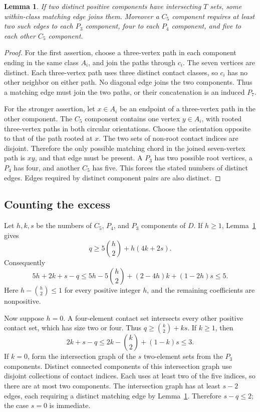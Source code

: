 \documentclass[11pt,a4paper]{article}
\newtheorem{lemma}[theorem]{Lemma}
\theoremstyle{definition}\newtheorem{definition}[theorem]{Definition}
\theoremstyle{remark}\newtheorem{remark}[theorem]{Remark}
\begin{document}
\begin{lemma}\label{local15:lem:force}
If two distinct positive components have intersecting $T$ sets, some
within-class matching edge joins them. Moreover a $C_5$ component
requires at least two such edges to each $P_3$ component, four to each
$P_4$ component, and five to each other $C_5$ component.
\end{lemma}
\begin{proof}
For the first assertion, choose a three-vertex path in each component
ending in the same class $A_i$, and join the paths through $c_i$.
The seven vertices are distinct. Each three-vertex path uses three
distinct contact classes, so $c_i$ has no other neighbor on either path.
No diagonal edge joins the two components. Thus a matching edge must
join the two paths, or their concatenation is an induced $P_7$.

For the stronger assertion, let $x\in A_i$ be an endpoint of a
three-vertex path in the other component. The $C_5$ component contains
one vertex $y\in A_i$, with rooted three-vertex paths in both circular
orientations. Choose the orientation opposite to that of the path rooted
at $x$. The two sets of non-root contact indices are disjoint. Therefore
the only possible matching chord in the joined seven-vertex path is
$xy$, and that edge must be present. A $P_3$ has two possible root
vertices, a $P_4$ has four, and another $C_5$ has five. This forces the
stated numbers of distinct edges. Edges required by distinct component
pairs are also distinct.
\end{proof}

\subsection{Counting the excess}
Let $h,k,s$ be the numbers of $C_5$, $P_4$, and $P_3$ components of $D$.
If $h\ge1$, Lemma~\ref{local15:lem:force} gives
\[
 q\ge5\binom h2+h(4k+2s).
\]
Consequently
\[
 5h+2k+s-q
 \le 5h-5\binom h2+(2-4h)k+(1-2h)s\le5.
\]
Here $h-\binom h2\le1$ for every positive integer $h$, and the remaining
coefficients are nonpositive.

Now suppose $h=0$. A four-element contact set intersects every other
positive contact set, which has size two or four. Thus
$q\ge\binom k2+ks$. If $k\ge1$, then
\[
 2k+s-q\le2k-\binom k2+(1-k)s\le3.
\]
If $k=0$, form the intersection graph of the $s$ two-element sets from
the $P_3$ components. Distinct connected components of this intersection
graph use disjoint collections of contact indices. Each uses at least
two of the five indices, so there are at most two components. The
intersection graph has at least $s-2$ edges, each requiring a distinct
matching edge by Lemma~\ref{local15:lem:force}. Therefore $s-q\le2$; the case
$s=0$ is immediate.
\end{document}
